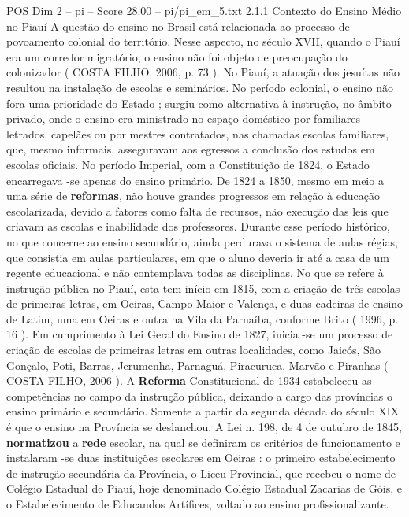 \begin{textsample}{POS Dim 2 – pi – Score 28.00 – pi/pi\_em\_5.txt}  \label{ex:f2_pos_097}
2.1.1 Contexto do Ensino Médio no Piauí A questão do ensino no Brasil está relacionada ao processo de povoamento colonial do território.
Nesse aspecto, no século XVII, quando o Piauí era um corredor migratório, o ensino não foi objeto de preocupação do colonizador ( COSTA FILHO, 2006, p. 73 ).
No Piauí, a atuação dos jesuítas não resultou na instalação de escolas e seminários.
No período colonial, o ensino não fora uma prioridade do Estado ; surgiu como alternativa à instrução, no âmbito privado, onde o ensino era ministrado no espaço doméstico por familiares letrados, capelães ou por mestres contratados, nas chamadas escolas familiares, que, mesmo informais, asseguravam aos egressos a conclusão dos estudos em escolas oficiais.
No período Imperial, com a Constituição de 1824, o Estado encarregava -se apenas do ensino primário.
De 1824 a 1850, mesmo em meio a uma série de \textbf{reformas}, não houve grandes progressos em relação à educação escolarizada, devido a fatores como falta de recursos, não execução das leis que criavam as escolas e inabilidade dos professores.
Durante esse período histórico, no que concerne ao ensino secundário, ainda perdurava o sistema de aulas régias, que consistia em aulas particulares, em que o aluno deveria ir até a casa de um regente educacional e não contemplava todas as disciplinas.
No que se refere à instrução pública no Piauí, esta tem início em 1815, com a criação de três escolas de primeiras letras, em Oeiras, Campo Maior e Valença, e duas cadeiras de ensino de Latim, uma em Oeiras e outra na Vila da Parnaíba, conforme Brito ( 1996, p. 16 ).
Em cumprimento à Lei Geral do Ensino de 1827, inicia -se um processo de criação de escolas de primeiras letras em outras localidades, como Jaicós, São Gonçalo, Poti, Barras, Jerumenha, Parnaguá, Piracuruca, Marvão e Piranhas ( COSTA FILHO, 2006 ).
A \textbf{Reforma} Constitucional de 1934 estabeleceu as competências no campo da instrução pública, deixando a cargo das províncias o ensino primário e secundário.
Somente a partir da segunda década do século XIX é que o ensino na Província se deslanchou.
A Lei n. 198, de 4 de outubro de 1845, \textbf{normatizou} a \textbf{rede} escolar, na qual se definiram os critérios de funcionamento e instalaram -se duas instituições escolares em Oeiras : o primeiro estabelecimento de instrução secundária da Província, o Liceu Provincial, que recebeu o nome de Colégio Estadual do Piauí, hoje denominado Colégio Estadual Zacarias de Góis, e o Estabelecimento de Educandos Artífices, voltado ao ensino profissionalizante.

\end{textsample}
